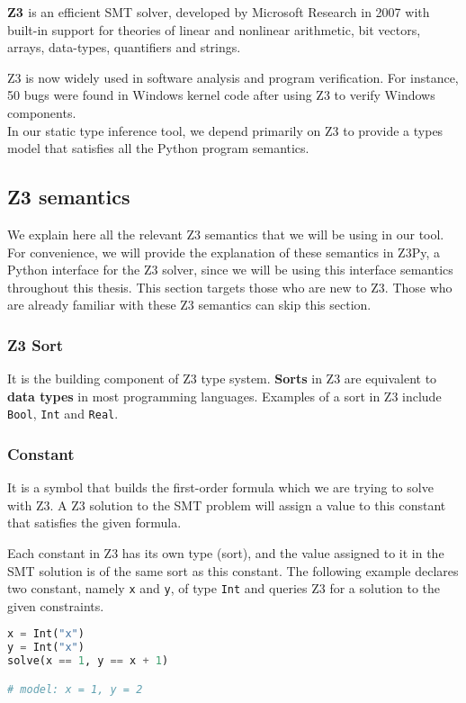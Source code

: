 \textbf{Z3 \cite{z3}} is an efficient SMT solver, developed by Microsoft Research in 2007 with built-in support for theories of linear and nonlinear arithmetic, bit vectors, arrays, data-types, quantifiers and strings.

Z3 is now widely used in software analysis and program verification. For instance, 50 bugs were found in Windows kernel code after using Z3 to verify Windows components.\\

In our static type inference tool, we depend primarily on Z3 to provide a types model that satisfies all the Python program semantics.

\subsection{Z3 semantics}
We explain here all the relevant Z3 semantics that we will be using in our tool. For convenience, we will provide the explanation of these semantics in Z3Py, a Python interface for the Z3 solver, since we will be using this interface semantics throughout this thesis. This section targets those who are new to Z3. Those who are already familiar with these Z3 semantics can skip this section.

\subsubsection{Z3 Sort}
It is the building component of Z3 type system. \textbf{Sorts} in Z3 are equivalent to \textbf{data types} in most programming languages. Examples of a sort in Z3 include \lstinline|Bool|, \lstinline|Int| and \lstinline|Real|.

\subsubsection{Constant}
It is a symbol that builds the first-order formula which we are trying to solve with Z3. A Z3 solution to the SMT problem will assign a value to this constant that satisfies the given formula.

Each constant in Z3 has its own type (sort), and the value assigned to it in the SMT solution is of the same sort as this constant. The following example declares two constant, namely \lstinline|x| and \lstinline|y|, of type \lstinline|Int| and queries Z3 for a solution to the given constraints.

\begin{lstlisting}[language=python]
x = Int("x")
y = Int("x")
solve(x == 1, y == x + 1)

# model: x = 1, y = 2
\end{lstlisting}


